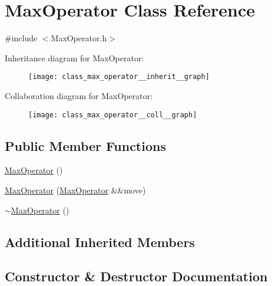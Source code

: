 \hypertarget{class_max_operator}{}\section{Max\+Operator Class Reference}
\label{class_max_operator}


{\ttfamily \#include $<$Max\+Operator.\+h$>$}



Inheritance diagram for Max\+Operator\+:
\nopagebreak
\begin{figure}[H]
\begin{center}
\leavevmode
\texttt{[image: class\_max\_operator\_\_inherit\_\_graph]}
\end{center}
\end{figure}


Collaboration diagram for Max\+Operator\+:
\nopagebreak
\begin{figure}[H]
\begin{center}
\leavevmode
\texttt{[image: class\_max\_operator\_\_coll\_\_graph]}
\end{center}
\end{figure}
\subsection*{Public Member Functions}
\begin{DoxyCompactItemize}
\item 
\mbox{\hyperlink{class_max_operator_a4fd3b97c62a4782d5d99617e31a14da9}{Max\+Operator}} ()
\item 
\mbox{\hyperlink{class_max_operator_a0c417f48301b6dd666a758136c3b24b9}{Max\+Operator}} (\mbox{\hyperlink{class_max_operator}{Max\+Operator}} \&\&move)
\item 
\mbox{\hyperlink{class_max_operator_a4e13979accc1c316f797ce9a509e7cdd}{$\sim$\+Max\+Operator}} ()
\end{DoxyCompactItemize}
\subsection*{Additional Inherited Members}


\subsection{Constructor \& Destructor Documentation}
\mbox{\label{class_max_operator_a4fd3b97c62a4782d5d99617e31a14da9}} 
